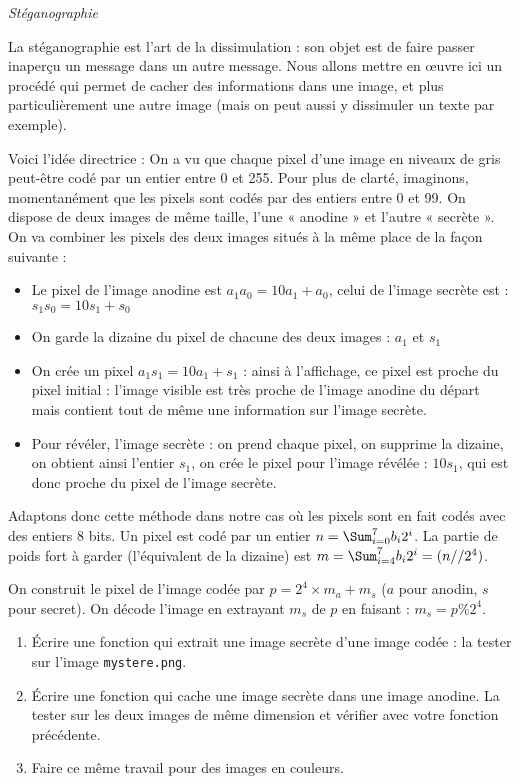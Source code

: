 \documentclass[10pt,a4paper,pdftex]{book}
\begin{document}
\begin{exoc}{\textit{Stéganographie}}

La stéganographie est l'art de la dissimulation : son objet est de faire passer inaperçu un message dans un autre message. Nous allons mettre en œuvre ici un procédé qui permet de cacher des informations dans une image, et plus particulièrement une autre image (mais on peut aussi y dissimuler un texte par exemple).

Voici l'idée directrice : On a vu que chaque pixel d'une image en niveaux de gris peut-être codé par un entier entre 0 et 255. Pour plus de clarté, imaginons, momentanément que les pixels sont codés par des entiers entre 0 et 99. On dispose de deux images de même taille, l'une « anodine » et l'autre « secrète ». On va combiner les pixels des deux images situés à la même place de la façon suivante :
\begin{itemize}
\item Le pixel de l'image anodine est $a_1a_0 = 10a_1+a_0$, celui de l'image secrète est : $s_1s_0 = 10s_1+s_0$
\item On garde la dizaine du pixel de chacune des deux images : $a_1$ et $s_1$
\item On crée un pixel $a_1s_1 = 10a_1 + s_1$ : ainsi à l'affichage, ce pixel est proche du pixel initial : l'image visible est très proche de l'image anodine du départ mais contient tout de même une information sur l'image secrète.
\item Pour révéler, l'image secrète : on prend chaque pixel, on supprime la dizaine, on obtient ainsi l'entier $s_1$, on crée le pixel pour l'image révélée : $10s_1$, qui est donc proche du pixel de l'image secrète.
\end{itemize}
\medskip
Adaptons donc cette méthode dans notre cas où les pixels sont en fait codés avec des entiers 8 bits. Un pixel est codé par un entier $n = \Sum_{i=0}^7 b_i2^i$.
La partie de poids fort à garder (l'équivalent de la dizaine) est $m = \Sum_{i=4}^7 b_i2^i = (n//2^4)$.

On construit le pixel de l'image codée par $p = 2^4 \times m_a + m_s$ ($a$ pour anodin, $s$ pour secret). On décode l'image en extrayant $m_s$ de $p$ en faisant : $m_s=p\%2^4$.
\begin{enumerate}
\item Écrire une fonction qui extrait une image secrète d'une image codée : la tester sur l'image \texttt{mystere.png}.
\item Écrire une fonction qui cache une image secrète dans une image anodine. La tester sur les deux images de même dimension et vérifier avec votre fonction précédente.
\item Faire ce même travail pour des images en couleurs.
\end{enumerate}
\end{exoc}





\faketableofcontents %
\end{document}
